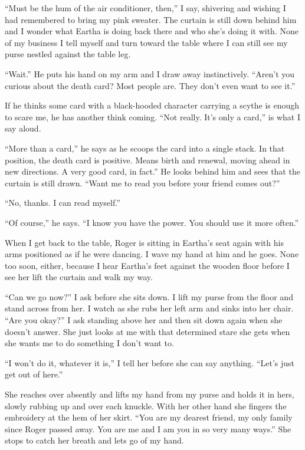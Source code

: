 \documentclass[twoside,10pt]{book}
\begin{document}
``Must be the hum of the air conditioner, then,'' I say, shivering and
wishing I had remembered to bring my pink sweater. The curtain is still
down behind him and I wonder what Eartha is doing back there and who
she's doing it with. None of my business I tell myself and turn toward
the table where I can still see my purse nestled against the table leg.

``Wait.'' He puts his hand on my arm and I draw away instinctively.
``Aren't you curious about the death card? Most people are. They don't
even want to see it.''

If he thinks some card with a black-hooded character carrying a scythe
is enough to scare me, he has another think coming. ``Not really. It's
only a card,'' is what I say aloud.

``More than a card,'' he says as he scoops the card into a single stack.
In that position, the death card is positive. Means birth and renewal,
moving ahead in new directions. A very good card, in fact.'' He looks
behind him and sees that the curtain is still drawn. ``Want me to read
you before your friend comes out?''

``No, thanks. I can read myself.''

``Of course,'' he says. ``I know you have the power. You should use it
more often.''

When I get back to the table, Roger is sitting in Eartha's seat again
with his arms positioned as if he were dancing. I wave my hand at him
and he goes. None too soon, either, because I hear Eartha's feet against
the wooden floor before I see her lift the curtain and walk my way.

``Can we go now?'' I ask before she sits down. I lift my purse from the
floor and stand across from her. I watch as she rubs her left arm and
sinks into her chair. ``Are you okay?'' I ask standing above her and
then sit down again when she doesn't answer. She just looks at me with
that determined stare she gets when she wants me to do something I don't
want to.

``I won't do it, whatever it is,'' I tell her before she can say
anything. ``Let's just get out of here.''

She reaches over absently and lifts my hand from my purse and holds it
in hers, slowly rubbing up and over each knuckle. With her other hand
she fingers the embroidery at the hem of her skirt. ``You are my dearest
friend, my only family since Roger passed away. You are me and I am you
in so very many ways.'' She stops to catch her breath and lets go of my
hand.
\end{document}
